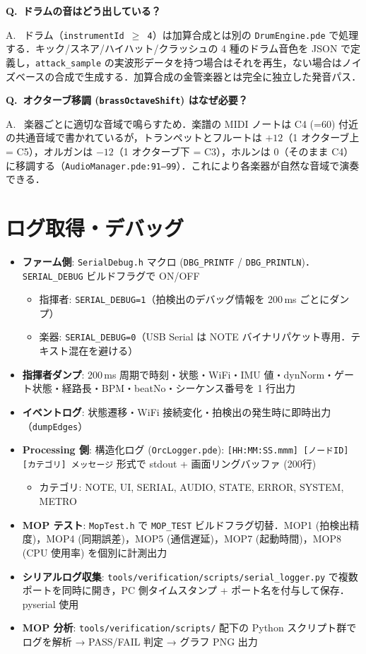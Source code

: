 \documentclass[uplatex,dvipdfmx,a4paper,10pt]{jsarticle}
\newcommand{\QA}[2]{%
  \par\noindent\textbf{\textcolor{qcolor}{Q.~#1}}%
  \par\noindent\textcolor{acolor}{A.~#2}\medskip%
}
\begin{document}
\QA{ドラムの音はどう出している？}{
ドラム（\texttt{instrumentId $\geq$ 4}）は加算合成とは別の \texttt{DrumEngine.pde} で処理する．キック/スネア/ハイハット/クラッシュの 4 種のドラム音色を JSON で定義し，\texttt{attack\_sample} の実波形データを持つ場合はそれを再生，ない場合はノイズベースの合成で生成する．加算合成の金管楽器とは完全に独立した発音パス．}

\QA{オクターブ移調 (\texttt{brassOctaveShift}) はなぜ必要？}{
楽器ごとに適切な音域で鳴らすため．楽譜の MIDI ノートは C4 (=60) 付近の共通音域で書かれているが，トランペットとフルートは $+12$（1 オクターブ上 = C5），オルガンは $-12$（1 オクターブ下 = C3），ホルンは $0$（そのまま C4）に移調する（\texttt{AudioManager.pde:91--99}）．これにより各楽器が自然な音域で演奏できる．}

\section{ログ取得・デバッグ}

\begin{tcolorbox}[cheatbox, title=実装要点]
\begin{itemize}
  \item \textbf{ファーム側}: \texttt{SerialDebug.h} マクロ (\texttt{DBG\_PRINTF} / \texttt{DBG\_PRINTLN})．\texttt{SERIAL\_DEBUG} ビルドフラグで ON/OFF
    \begin{itemize}
      \item 指揮者: \texttt{SERIAL\_DEBUG=1}（拍検出のデバッグ情報を 200\,ms ごとにダンプ）
      \item 楽器: \texttt{SERIAL\_DEBUG=0}（USB Serial は NOTE バイナリパケット専用．テキスト混在を避ける）
    \end{itemize}
  \item \textbf{指揮者ダンプ}: 200\,ms 周期で時刻・状態・WiFi・IMU 値・dynNorm・ゲート状態・経路長・BPM・beatNo・シーケンス番号を 1 行出力
  \item \textbf{イベントログ}: 状態遷移・WiFi 接続変化・拍検出の発生時に即時出力（\texttt{dumpEdges}）
  \item \textbf{Processing 側}: 構造化ログ (\texttt{OrcLogger.pde}): \texttt{[HH:MM:SS.mmm] [ノードID] [カテゴリ] メッセージ} 形式で stdout + 画面リングバッファ (200行)
    \begin{itemize}
      \item カテゴリ: NOTE, UI, SERIAL, AUDIO, STATE, ERROR, SYSTEM, METRO
    \end{itemize}
  \item \textbf{MOP テスト}: \texttt{MopTest.h} で \texttt{MOP\_TEST} ビルドフラグ切替．MOP1 (拍検出精度)，MOP4 (同期誤差)，MOP5 (通信遅延)，MOP7 (起動時間)，MOP8 (CPU 使用率) を個別に計測出力
  \item \textbf{シリアルログ収集}: \texttt{tools/verification/scripts/serial\_logger.py} で複数ポートを同時に開き，PC 側タイムスタンプ + ポート名を付与して保存．pyserial 使用
  \item \textbf{MOP 分析}: \texttt{tools/verification/scripts/} 配下の Python スクリプト群でログを解析 → PASS/FAIL 判定 → グラフ PNG 出力
\end{itemize}
\end{tcolorbox}
\end{document}
